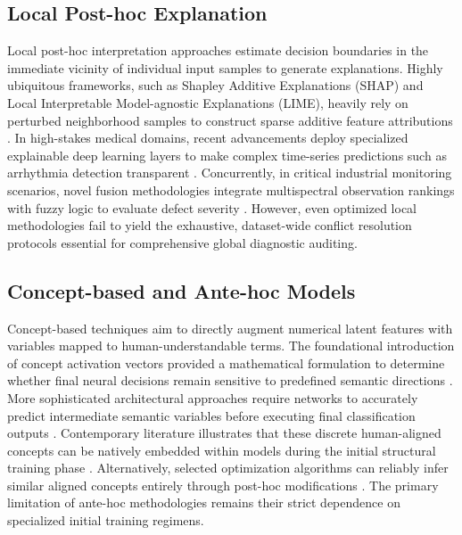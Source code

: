 \documentclass[make,article,submit,pdftex,moreauthors]{Definitions/mdpi}
\begin{document}
\subsection{Local Post-hoc Explanation}
\label{subsec:local_explanation}
Local post-hoc interpretation approaches estimate decision boundaries in the immediate vicinity of individual input samples to generate explanations. Highly ubiquitous frameworks, such as Shapley Additive Explanations (SHAP) and Local Interpretable Model-agnostic Explanations (LIME), heavily rely on perturbed neighborhood samples to construct sparse additive feature attributions \cite{Salih2025SHAPLIME}. In high-stakes medical domains, recent advancements deploy specialized explainable deep learning layers to make complex time-series predictions such as arrhythmia detection transparent \cite{Kovalchuk2025Transparent}. Concurrently, in critical industrial monitoring scenarios, novel fusion methodologies integrate multispectral observation rankings with fuzzy logic to evaluate defect severity \cite{Radiuk2025Criticality}. However, even optimized local methodologies fail to yield the exhaustive, dataset-wide conflict resolution protocols essential for comprehensive global diagnostic auditing.

\subsection{Concept-based and Ante-hoc Models}
\label{subsec:concept_explanation}
Concept-based techniques aim to directly augment numerical latent features with variables mapped to human-understandable terms. The foundational introduction of concept activation vectors provided a mathematical formulation to determine whether final neural decisions remain sensitive to predefined semantic directions \cite{Nicolson2025CAV}. More sophisticated architectural approaches require networks to accurately predict intermediate semantic variables before executing final classification outputs \cite{Srivastava2024VLGCBM}. Contemporary literature illustrates that these discrete human-aligned concepts can be natively embedded within models during the initial structural training phase \cite{Zarlenga2022ConceptEmbedding}. Alternatively, selected optimization algorithms can reliably infer similar aligned concepts entirely through post-hoc modifications \cite{Yuksekgonul2023PostHocCBM}. The primary limitation of ante-hoc methodologies remains their strict dependence on specialized initial training regimens.
\end{document}
